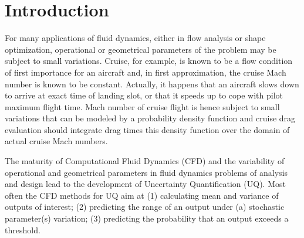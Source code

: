 \documentclass{eurosae}
\newcommand{\sref}[1]{Sect.~\ref{#1}}
\begin{document}
\maketitle

\begin{abstract}
The maturity of Computational Fluid Dynamics (CFD) and the variability of operational and geometrical parameters in fluid dynamics  analysis and design lead to the development of Uncertainty Quantification (UQ). Among the numerous methods for UQ, these lecture notes describe the main features of Monte-Carlo and metamodel-based Monte-Carlo in \sref{sec:MC}, generalized Polynomial Chaos in \sref{sec:gPC}, and Stochastic Collocation in \sref{sec:SC}. The broadly used sparse grid quadrature method of Smolyak \cite{Smo_63} is then presented \sref{sec:SGQ}. Lastly \sref{sec:Var} introduces some concepts of variance analysis. Two applications of UQ to 2D and 3D RANS flows, that have been carried out at \Onera, are finally outlined in \sref{sec:Examples}.
\end{abstract}

\tableofcontents

\section{Introduction}
%
 For many applications of fluid dynamics, either in flow analysis or shape optimization,
 operational or geometrical parameters of the problem may be subject to small variations. 
 Cruise, for example, is known to be a flow condition of first importance for an aircraft and, in
 first approximation, the cruise Mach number is known to be constant. Actually, it happens that 
 an aircraft slows down to arrive at exact time of landing slot, or that it speeds 
  up to cope with pilot maximum flight time. Mach number of cruise flight is hence subject
 to small variations that can be modeled by a probability density function and 
  cruise drag evaluation should integrate drag times this density function over the domain
 of actual cruise Mach numbers.

 The maturity of Computational Fluid Dynamics (CFD) and the variability of operational and geometrical parameters in fluid dynamics problems of analysis
and design lead to the development of Uncertainty Quantification (UQ).
 Most often the CFD methods for UQ aim at (1) calculating mean and variance
 of outputs of interest; (2) predicting the range of an output under (a) stochastic parameter(s) variation;
  (3) predicting the probability that an output exceeds a threshold.
\end{document}
